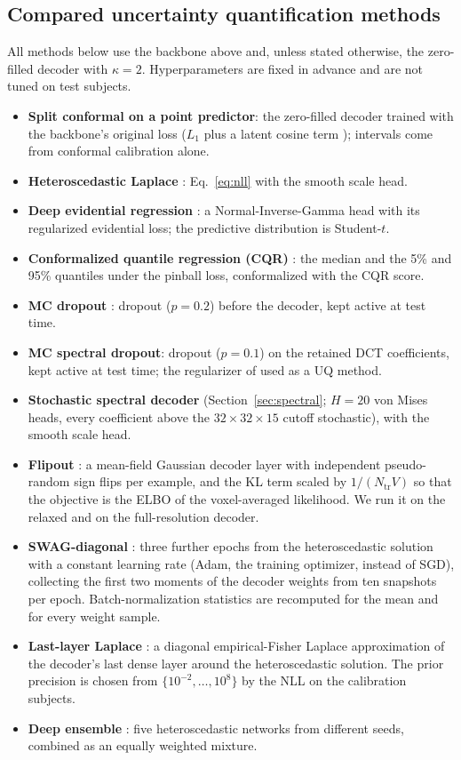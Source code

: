 \subsection{Compared uncertainty quantification methods}\label{sec:uqmethods}
All methods below use the backbone above and, unless stated otherwise, the zero-filled decoder with $\kappa=2$. Hyperparameters are fixed in advance and are not tuned on test subjects.
\begin{itemize}
	\item \textbf{Split conformal on a point predictor}: the zero-filled decoder trained with the backbone's original loss ($L_1$ plus a latent cosine term \citep{calhas2022eeg}); intervals come from conformal calibration alone.
	\item \textbf{Heteroscedastic Laplace} \citep{kendall2017uncertainties}: Eq.~\eqref{eq:nll} with the smooth scale head.
	\item \textbf{Deep evidential regression} \citep{amini2020deep}: a Normal-Inverse-Gamma head with its regularized evidential loss; the predictive distribution is Student-$t$.
	\item \textbf{Conformalized quantile regression (CQR)} \citep{romano2019conformalized}: the median and the 5\% and 95\% quantiles under the pinball loss, conformalized with the CQR score.
	\item \textbf{MC dropout} \citep{gal2016dropout}: dropout ($p=0.2$) before the decoder, kept active at test time.
	\item \textbf{MC spectral dropout}: dropout ($p=0.1$) on the retained DCT coefficients, kept active at test time; the regularizer of \citet{khan2019regularization} used as a UQ method.
	\item \textbf{Stochastic spectral decoder} (Section~\ref{sec:spectral}; $H=20$ von Mises heads, every coefficient above the $32\times32\times15$ cutoff stochastic), with the smooth scale head.
	\item \textbf{Flipout} \citep{wen2018flipout}: a mean-field Gaussian decoder layer with independent pseudo-random sign flips per example, and the KL term scaled by $1/(N_{\mathrm{tr}}V)$ so that the objective is the ELBO of the voxel-averaged likelihood. We run it on the relaxed and on the full-resolution decoder.
	\item \textbf{SWAG-diagonal} \citep{maddox2019simple}: three further epochs from the heteroscedastic solution with a constant learning rate (Adam, the training optimizer, instead of SGD), collecting the first two moments of the decoder weights from ten snapshots per epoch. Batch-normalization statistics are recomputed for the mean and for every weight sample.
	\item \textbf{Last-layer Laplace} \citep{daxberger2021laplace}: a diagonal empirical-Fisher Laplace approximation of the decoder's last dense layer around the heteroscedastic solution. The prior precision is chosen from $\{10^{-2},\dots,10^{8}\}$ by the NLL on the calibration subjects.
	\item \textbf{Deep ensemble} \citep{lakshminarayanan2017simple}: five heteroscedastic networks from different seeds, combined as an equally weighted mixture.
\end{itemize}
